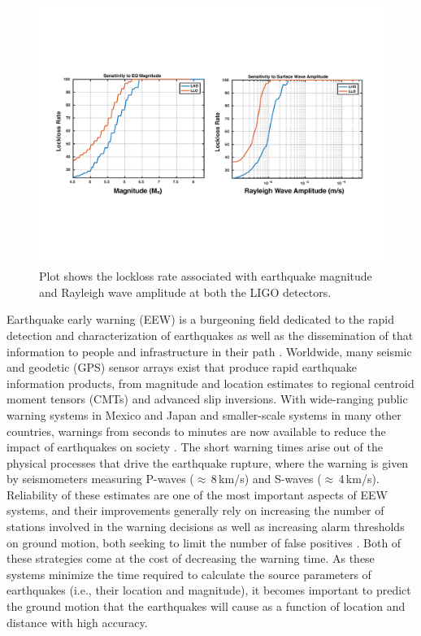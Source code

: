 \documentclass[reprint, prl, aps, showpacs]{revtex4-1}
\begin{document}
\begin{figure}[!htb]
  \includegraphics[width=\textwidth]{./plots/Lockloss_Sensitivity.pdf}
 \caption{Plot shows the lockloss rate associated with earthquake magnitude and Rayleigh wave amplitude at both the LIGO detectors.}
 \label{fig:lockloss_sensitivity}
\end{figure}


Earthquake early warning (EEW) is a burgeoning field dedicated to the rapid detection and characterization of earthquakes as well as the dissemination of that information to people and infrastructure in their path \cite{Al2012,KuAl2013a,KuAl2013b,KuHe2014,CoLa2009a,CoLa2009b,BoAl2014,HoKa2008,HoEA2011c,StAl2016}.
Worldwide, many seismic and geodetic (GPS) sensor arrays exist that produce rapid earthquake information products, from magnitude and location estimates to regional centroid moment tensors (CMTs) and advanced slip inversions.
With wide-ranging public warning systems in Mexico and Japan and smaller-scale systems in many other countries, warnings from seconds to minutes are now available to reduce the impact of earthquakes on society \cite{StAl2016}.
The short warning times arise out of the physical processes that drive the earthquake rupture, where the warning is given by seismometers measuring P-waves ($\approx$\,8\,km/s) and S-waves ($\approx$\,4\,km/s).
Reliability of these estimates are one of the most important aspects of EEW systems, and their improvements generally rely on increasing the number of stations involved in the warning decisions as well as increasing alarm thresholds on ground motion, both seeking to limit the number of false positives \cite{KuCo2015}. Both of these strategies come at the cost of decreasing the warning time. 
As these systems minimize the time required to calculate the source parameters of earthquakes (i.e., their location and magnitude), it becomes important to predict the ground motion that the earthquakes will cause as a function of location and distance with high accuracy.
\end{document}
